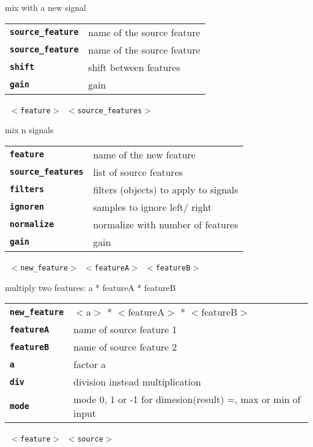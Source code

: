 \begin{description}
\begin{description}
        mix with a new signal

      \begin{tabular}{ll}
 \texttt{\textbf{source\_feature}} &  name of the source feature \\
 \texttt{\textbf{source\_feature}} &  name of the source feature \\
 \texttt{\textbf{shift}} &            shift between features  \\
 \texttt{\textbf{gain}} &             gain  \\
      \end{tabular}
       \texttt{ $<$feature$>$ $<$source\_features$>$    } \

        mix n signals

      \begin{tabular}{ll}
 \texttt{\textbf{feature}} &          name of the new feature \\
 \texttt{\textbf{source\_features}} &  list of source features  \\
 \texttt{\textbf{filters}} &           filters (objects) to apply to signals  \\
 \texttt{\textbf{ignoren}} &           samples to ignore left/ right  \\
 \texttt{\textbf{normalize}} &         normalize with number of features  \\
 \texttt{\textbf{gain}} &              gain  \\
      \end{tabular}
       \texttt{ $<$new\_feature$>$ $<$featureA$>$ $<$featureB$>$   } \

        multiply two features: a * featureA * featureB

      \begin{tabular}{ll}
 \texttt{\textbf{new\_feature}} &  $<$a$>$ * $<$featureA$>$ * $<$featureB$>$ \\
 \texttt{\textbf{featureA}} &     name of source feature 1 \\
 \texttt{\textbf{featureB}} &     name of source feature 2 \\
 \texttt{\textbf{a}} &             factor a  \\
 \texttt{\textbf{div}} &           division instead multiplication  \\
 \texttt{\textbf{mode}} &          mode 0, 1 or -1 for dimesion(result) =, max or min of input  \\
      \end{tabular}
       \texttt{ $<$feature$>$ $<$source$>$  } \


\end{description}
\end{description}
